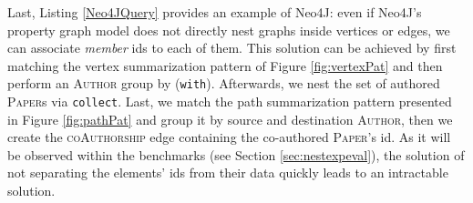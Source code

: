 Last, Listing \ref{Neo4JQuery} provides an example of Neo4J: even if Neo4J's property graph model does not directly nest graphs inside vertices or edges, we can associate \textit{member} ids to each of them. This solution can be achieved by  first matching the vertex summarization pattern of Figure \ref{fig:vertexPat} and then perform an \textsc{Author} group by (\texttt{with}). Afterwards, we nest the set of authored \textsc{Paper}s via \texttt{collect}. Last, we match the path summarization pattern presented in Figure \ref{fig:pathPat} and group it by source and destination \textsc{Author}, then we create the \textsc{coAuthorship} edge containing the co-authored \textsc{Paper}'s id. As it will be observed within the benchmarks (see Section \ref{sec:nestexpeval}), the solution of not separating the elements' ids from their data quickly leads to an intractable solution.